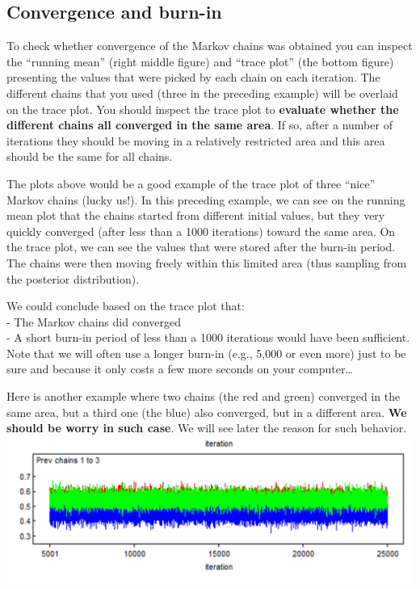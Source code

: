 \documentclass[
]{book}
\begin{document}
\hypertarget{convergence-and-burn-in}{%
\subsection{Convergence and burn-in}\label{convergence-and-burn-in}}

To check whether convergence of the Markov chains was obtained you can
inspect the ``running mean'' (right middle figure) and ``trace plot''
(the bottom figure) presenting the values that were picked by each chain
on each iteration. The different chains that you used (three in the
preceding example) will be overlaid on the trace plot. You should
inspect the trace plot to \textbf{evaluate whether the different chains
all converged in the same area}. If so, after a number of iterations
they should be moving in a relatively restricted area and this area
should be the same for all chains.

The plots above would be a good example of the trace plot of three
``nice'' Markov chains (lucky us!). In this preceding example, we can
see on the running mean plot that the chains started from different
initial values, but they very quickly converged (after less than a 1000
iterations) toward the same area. On the trace plot, we can see the
values that were stored after the burn-in period. The chains were then
moving freely within this limited area (thus sampling from the posterior
distribution).

We could conclude based on the trace plot that:\\
- The Markov chains did converged\\
- A short burn-in period of less than a 1000 iterations would have been
sufficient. Note that we will often use a longer burn-in (e.g., 5,000 or
even more) just to be sure and because it only costs a few more seconds
on your computer\ldots{}

Here is another example where two chains (the red and green) converged
in the same area, but a third one (the blue) also converged, but in a
different area. \textbf{We should be worry in such case}. We will see
later the reason for such behavior.
\includegraphics{Figures/2 nice 1 bad chain.png}
\end{document}
